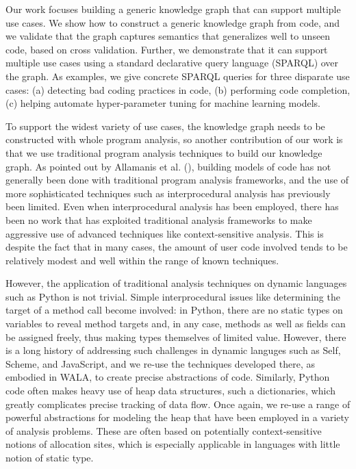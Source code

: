 Our work focuses building a generic knowledge graph that can support multiple use cases.   We show how to construct a generic knowledge graph from code, and we validate that the graph captures semantics that generalizes well to unseen code, based on cross validation.  Further, we demonstrate that it can support multiple use cases using a standard declarative query language (SPARQL) over the graph.  As examples, we give concrete SPARQL queries for three disparate use cases: (a) detecting bad coding practices in code, (b) performing code completion, (c) helping automate hyper-parameter tuning for machine learning models.  

To support the widest variety of use cases, the knowledge graph needs to be constructed with whole program analysis, so another contribution of our work is that we use traditional program analysis techniques to build our knowledge graph.  As pointed out by Allamanis et al. (\cite{Allamanis:2018:SML:3236632.3212695}), building models of code has not generally been done with traditional program analysis frameworks, and the use of more sophisticated techniques such as interprocedural analysis has previously been limited.  Even when interprocedural analysis has been employed, there has been no work that has exploited traditional analysis frameworks to make aggressive use of advanced techniques like context-sensitive analysis.  This is despite the fact that in many cases, the amount of user code involved tends to be relatively modest and well within the range of known techniques.  

However, the application of traditional analysis techniques on dynamic languages such as Python is not trivial.  Simple interprocedural issues like determining the target of a method call become involved: in Python, there are no static types on variables to reveal method targets and, in any case, methods as well as fields can be assigned freely, thus making types themselves of limited value.  However, there is a long history of addressing such challenges in dynamic languges such as Self\cite{Agesen1995TypeIO,chambers1990iterative}, Scheme\cite{taminglambda}, and JavaScript\cite{DBLP:conf/icse/FeldthausSSDT13}, and we re-use the techniques developed there, as embodied in WALA, to create precise abstractions of code.  Similarly, Python code often makes heavy use of heap data structures, such a dictionaries, which greatly complicates precise tracking of data flow.  Once again, we re-use a range of powerful abstractions for modeling the heap that have been employed in a variety of analysis problems.  These are often based on potentially context-sensitive notions of allocation sites, which is especially applicable in languages with little notion of static type.  

